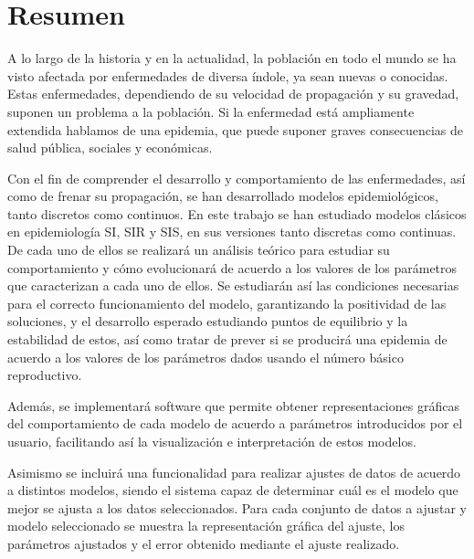 

\chapter*{Resumen}


A lo largo de la historia y en la actualidad, la población en todo el mundo se ha visto afectada por enfermedades de diversa índole, ya sean nuevas o conocidas. Estas enfermedades, dependiendo de su velocidad de propagación y su gravedad, suponen un problema a la población. Si la enfermedad está ampliamente extendida hablamos de una epidemia, que puede suponer graves consecuencias de salud pública, sociales y económicas.

Con el fin de comprender el desarrollo y comportamiento de las enfermedades, así como de frenar su propagación, se han desarrollado modelos epidemiológicos, tanto discretos como continuos. En este trabajo se han estudiado modelos clásicos en epidemiología SI, SIR y SIS, en sus versiones tanto discretas como continuas. De cada uno de ellos se realizará un análisis teórico para estudiar su comportamiento y cómo evolucionará de acuerdo a los valores de los parámetros que caracterizan a cada uno de ellos. Se estudiarán así las condiciones necesarias para el correcto funcionamiento del modelo, garantizando la positividad de las soluciones, y el desarrollo esperado estudiando puntos de equilibrio y la estabilidad de estos, así como tratar de prever si se producirá una epidemia de acuerdo a los valores de los parámetros dados usando el número básico reproductivo.

Además, se implementará software que permite obtener representaciones gráficas del comportamiento de cada modelo de acuerdo a parámetros introducidos por el usuario, facilitando así la visualización e interpretación de estos modelos.

Asimismo se incluirá una funcionalidad para realizar ajustes de datos de acuerdo a distintos modelos, siendo el sistema capaz de determinar cuál es el modelo que mejor se ajusta a los datos seleccionados. Para cada conjunto de datos a ajustar y modelo seleccionado se muestra la representación gráfica del ajuste, los parámetros ajustados y el error obtenido mediante el ajuste realizado.

